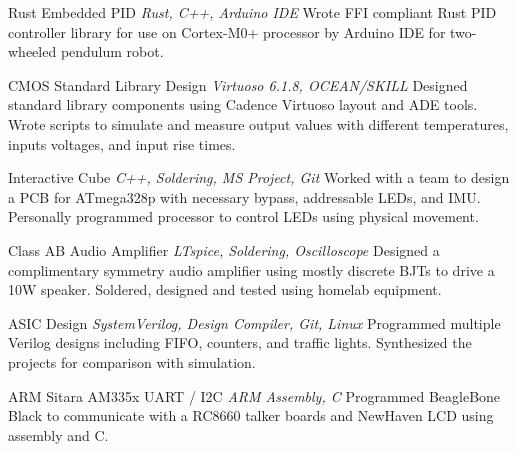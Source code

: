\documentclass[letterpaper]{moderncv}        %
\begin{document}
\cventry
{}
{Rust Embedded PID}
{}
{\textit{Rust, C++, Arduino IDE}}
{}
{Wrote FFI compliant Rust PID controller library for use on Cortex-M0+ processor by Arduino IDE for two-wheeled pendulum robot.\\}
	
\cventry
{}
{CMOS Standard Library Design}
{}
{\textit{Virtuoso 6.1.8, OCEAN/SKILL}}
{}
{Designed standard library components using Cadence Virtuoso layout and ADE tools.  Wrote scripts to simulate and measure output values with different temperatures, inputs voltages, and input rise times.\\}	

\cventry
{}
{Interactive Cube}
{}
{\textit{C++, Soldering, MS Project, Git}}
{}
{Worked with a team to design a PCB for ATmega328p with necessary bypass, addressable LEDs, and IMU. Personally programmed processor to control LEDs using physical movement. \\}	
	
\cventry
{}
{Class AB Audio Amplifier}
{}
{\textit{LTspice, Soldering, Oscilloscope}}
{}
{Designed a complimentary symmetry audio amplifier using mostly discrete BJTs to drive a 10W speaker.  Soldered, designed and tested using homelab equipment. \\}	

	
\cventry
{}
{ASIC Design}
{}
{\textit{SystemVerilog, Design Compiler, Git, Linux}}
{}
{Programmed multiple Verilog designs including FIFO, counters, and traffic lights.  Synthesized the projects for comparison with simulation.\\}
	
	
\cventry
{}
{ARM Sitara AM335x UART / I2C}
{}
{\textit{ARM Assembly, C}}
{}
{Programmed BeagleBone Black to communicate with a RC8660 talker boards and NewHaven LCD using assembly and C.\\}			
\end{document}
